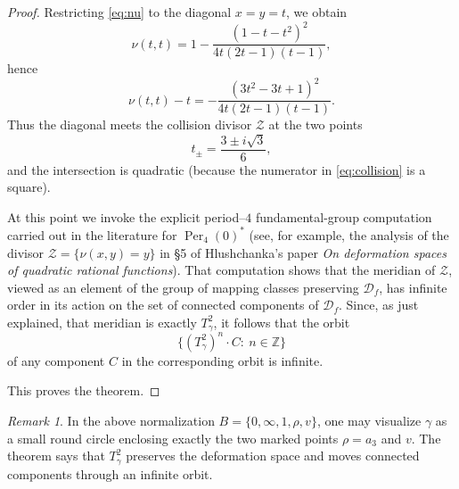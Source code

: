 \documentclass[11pt]{article}
\theoremstyle{remark}
\newtheorem{remark}[theorem]{Remark}
\newcommand{\Dsp}{\mathcal D_f}
\begin{document}
\begin{proof}
Restricting \eqref{eq:nu} to the diagonal \(x=y=t\), we obtain
\[
\nu(t,t)=1-\frac{(1-t-t^2)^2}{4t(2t-1)(t-1)},
\]
hence
\begin{equation}\label{eq:collision}
\nu(t,t)-t
=
-\frac{(3t^2-3t+1)^2}{4t(2t-1)(t-1)}.
\end{equation}
Thus the diagonal meets the collision divisor \(\mathcal Z\) at the two points
\[
t_\pm=\frac{3\pm i\sqrt 3}{6},
\]
and the intersection is quadratic (because the numerator in \eqref{eq:collision} is a square).

At this point we invoke the explicit period--$4$ fundamental-group computation carried out in
the literature for \(\operatorname{Per}_4(0)^*\) (see, for example, the analysis of the divisor
\(\mathcal Z=\{\nu(x,y)=y\}\) in \S5 of Hlushchanka's paper \emph{On deformation spaces of
quadratic rational functions}). That computation shows that the meridian of \(\mathcal Z\),
viewed as an element of the group of mapping classes preserving \(\Dsp\), has infinite order
in its action on the set of connected components of \(\Dsp\). Since, as just explained, that
meridian is exactly \(T_\gamma^2\), it follows that the orbit
\[
\{(T_\gamma^2)^n\cdot C:\ n\in\mathbb Z\}
\]
of any component \(C\) in the corresponding orbit is infinite.

This proves the theorem.
\end{proof}

\begin{remark}
In the above normalization \(B=\{0,\infty,1,\rho,v\}\), one may visualize \(\gamma\) as a small
round circle enclosing exactly the two marked points \(\rho=a_3\) and \(v\). The theorem says
that \(T_\gamma^2\) preserves the deformation space and moves connected components through an
infinite orbit.
\end{remark}
\end{document}
